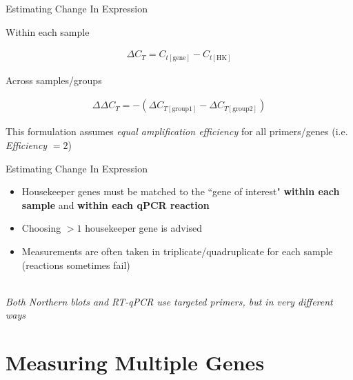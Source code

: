 \documentclass[aspectratio=169,11pt]{beamer}
\begin{document}
\begin{frame}{Estimating Change In Expression}

	Within each sample

	\begin{align*}
	\Delta C_T = C_{t[\text{gene}]} - C_{t[\text{HK}]}
	\end{align*}
	
	Across samples/groups
	
	\begin{align*}
	\Delta \Delta C_T = - (\Delta C_{T[\text{group1}]} - \Delta C_{T[\text{group2}]})
	\end{align*}
	
	This formulation assumes \textit{equal amplification efficiency} for all primers/genes (i.e. \textit{Efficiency} $= 2$)

\end{frame}

\begin{frame}{Estimating Change In Expression}

	\begin{itemize}
		\item Housekeeper genes must be matched to the ``gene of interest" \textbf{within each sample} and \textbf{within each qPCR reaction}
		\item Choosing $>1$ housekeeper gene is advised
		\item Measurements are often taken in triplicate/quadruplicate for each sample (reactions sometimes fail)
	\end{itemize}
	
	~\\
	\textit{Both Northern blots and RT-qPCR use targeted primers, but in very different ways}

\end{frame}

\section{Measuring Multiple Genes}

\end{document}
